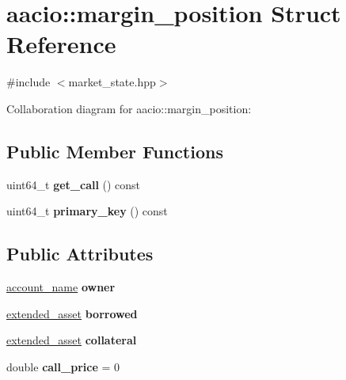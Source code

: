 \hypertarget{structaacio_1_1margin__position}{}\section{aacio\+:\+:margin\+\_\+position Struct Reference}
\label{structaacio_1_1margin__position}


{\ttfamily \#include $<$market\+\_\+state.\+hpp$>$}



Collaboration diagram for aacio\+:\+:margin\+\_\+position\+:
\subsection*{Public Member Functions}
\begin{DoxyCompactItemize}
\item 
\mbox{\label{structaacio_1_1margin__position_a19c9cf8711ec1742a909d5c868d586a8}} 
uint64\+\_\+t {\bfseries get\+\_\+call} () const
\item 
\mbox{\label{structaacio_1_1margin__position_a523efaa85c7559df99fe8b99a3053b4b}} 
uint64\+\_\+t {\bfseries primary\+\_\+key} () const
\end{DoxyCompactItemize}
\subsection*{Public Attributes}
\begin{DoxyCompactItemize}
\item 
\mbox{\label{structaacio_1_1margin__position_a7fda5e8ea1793fba9ac5a860c5ea7253}} 
\mbox{\hyperlink{structaacio_1_1chain_1_1name}{account\+\_\+name}} {\bfseries owner}
\item 
\mbox{\label{structaacio_1_1margin__position_a022755c98a66b6edf2a8f07b66d8b978}} 
\mbox{\hyperlink{structaacio_1_1extended__asset}{extended\+\_\+asset}} {\bfseries borrowed}
\item 
\mbox{\label{structaacio_1_1margin__position_ab64a2db52246365e6c598f30d371d5b4}} 
\mbox{\hyperlink{structaacio_1_1extended__asset}{extended\+\_\+asset}} {\bfseries collateral}
\item 
\mbox{\label{structaacio_1_1margin__position_a90198767058021e3ca79a82a62a9bc47}} 
double {\bfseries call\+\_\+price} = 0
\end{DoxyCompactItemize}


